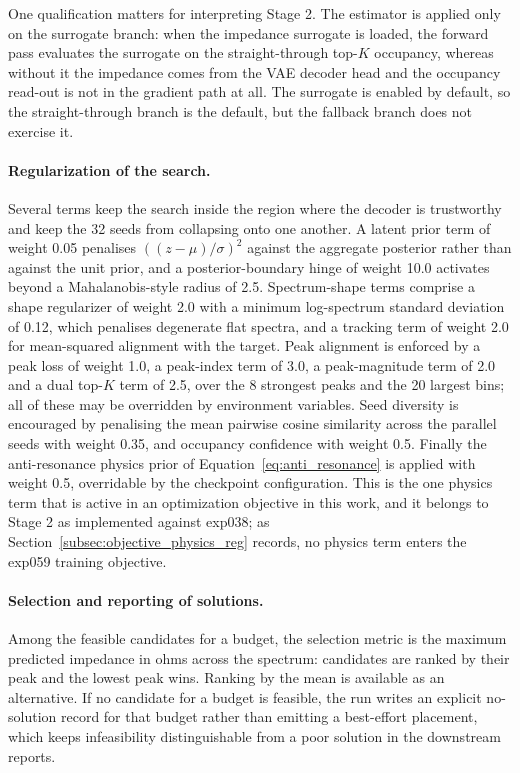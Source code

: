 One qualification matters for interpreting Stage 2. The estimator is applied only on the surrogate
branch: when the impedance surrogate is loaded, the forward pass evaluates the surrogate on the
straight-through top-$K$ occupancy, whereas without it the impedance comes from the VAE decoder head
and the occupancy read-out is not in the gradient path at all. The surrogate is enabled by default,
so the straight-through branch is the default, but the fallback branch does not exercise it.

\paragraph{Regularization of the search.} Several terms keep the search inside the region where the
decoder is trustworthy and keep the 32 seeds from collapsing onto one another. A latent prior term of
weight 0.05 penalises $((z - \mu)/\sigma)^2$ against the aggregate posterior rather than against the
unit prior, and a posterior-boundary hinge of weight 10.0 activates beyond a Mahalanobis-style radius
of 2.5. Spectrum-shape terms comprise a shape regularizer of weight 2.0 with a minimum log-spectrum
standard deviation of 0.12, which penalises degenerate flat spectra, and a tracking term of weight
2.0 for mean-squared alignment with the target. Peak alignment is enforced by a peak loss of weight
1.0, a peak-index term of 3.0, a peak-magnitude term of 2.0 and a dual top-$K$ term of 2.5, over the
8 strongest peaks and the 20 largest bins; all of these may be overridden by environment variables.
Seed diversity is encouraged by penalising the mean pairwise cosine similarity across the parallel
seeds with weight 0.35, and occupancy confidence with weight 0.5. Finally the anti-resonance physics
prior of Equation~\ref{eq:anti_resonance} is applied with weight 0.5, overridable by the checkpoint
configuration. This is the one physics term that is active in an optimization objective in this work,
and it belongs to Stage 2 as implemented against exp038; as
Section~\ref{subsec:objective_physics_reg} records, no physics term enters the exp059 training
objective.

\paragraph{Selection and reporting of solutions.} Among the feasible candidates for a budget, the
selection metric is the maximum predicted impedance in ohms across the spectrum: candidates are
ranked by their peak and the lowest peak wins. Ranking by the mean is available as an alternative. If
no candidate for a budget is feasible, the run writes an explicit no-solution record for that budget
rather than emitting a best-effort placement, which keeps infeasibility distinguishable from a poor
solution in the downstream reports.

